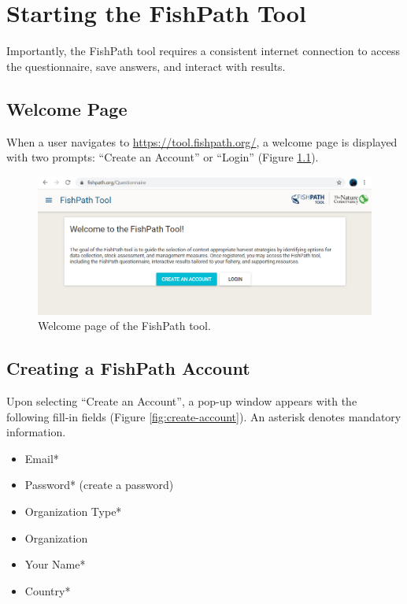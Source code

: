 \documentclass[
  11pt,
]{book}
\providecommand{\tightlist}{%
  \setlength{\itemsep}{0pt}\setlength{\parskip}{0pt}}
\begin{document}
\hypertarget{starting-the-fishpath-tool}{%
\chapter{Starting the FishPath Tool}\label{starting-the-fishpath-tool}}

Importantly, the FishPath tool requires a consistent internet connection to access the questionnaire, save answers, and interact with results.

\hypertarget{welcome-page}{%
\section{Welcome Page}\label{welcome-page}}

When a user navigates to \url{https://tool.fishpath.org/}, a welcome page is displayed with two prompts: ``Create an Account'' or ``Login'' (Figure \ref{fig:welcome}).

\begin{figure}

{\centering \includegraphics[width=0.95\linewidth]{images/welcome-page} 

}

\caption{Welcome page of the FishPath tool.}\label{fig:welcome}
\end{figure}

\hypertarget{creating-a-fishpath-account}{%
\section{Creating a FishPath Account}\label{creating-a-fishpath-account}}

Upon selecting ``Create an Account'', a pop-up window appears with the following fill-in fields (Figure \ref{fig:create-account}). An asterisk denotes mandatory information.

\begin{itemize}
\tightlist
\item
  Email*
\item
  Password* (create a password)
\item
  Organization Type*
\item
  Organization
\item
  Your Name*
\item
  Country*
\end{itemize}
\end{document}
